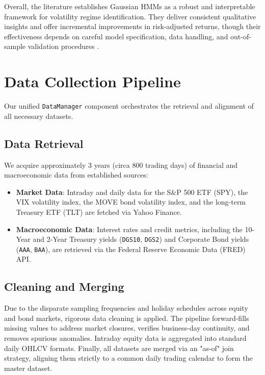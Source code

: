 \documentclass[a4paper,fleqn]{cas-dc} %
\begin{document}
Overall, the literature establishes Gaussian HMMs as a robust and interpretable framework for volatility regime identification. They deliver consistent qualitative insights and offer incremental improvements in risk-adjusted returns, though their effectiveness depends on careful model specification, data handling, and out-of-sample validation procedures \cite{Duriez2025, Wang2020}.

\section{Data Collection Pipeline}
Our unified \texttt{DataManager} component orchestrates the retrieval and alignment of all necessary datasets.

\subsection{Data Retrieval}
We acquire approximately 3 years (circa 800 trading days) of financial and macroeconomic data from established sources:
\begin{itemize}
    \item \textbf{Market Data}: Intraday and daily data for the S\&P 500 ETF (SPY), the VIX volatility index, the MOVE bond volatility index, and the long-term Treasury ETF (TLT) are fetched via Yahoo Finance.
    \item \textbf{Macroeconomic Data}: Interest rates and credit metrics, including the 10-Year and 2-Year Treasury yields (\texttt{DGS10}, \texttt{DGS2}) and Corporate Bond yields (\texttt{AAA}, \texttt{BAA}), are retrieved via the Federal Reserve Economic Data (FRED) API.
\end{itemize}

\subsection{Cleaning and Merging}
Due to the disparate sampling frequencies and holiday schedules across equity and bond markets, rigorous data cleaning is applied. The pipeline forward-fills missing values to address market closures, verifies business-day continuity, and removes spurious anomalies. Intraday equity data is aggregated into standard daily OHLCV formats. Finally, all datasets are merged via an "as-of" join strategy, aligning them strictly to a common daily trading calendar to form the master dataset.
\end{document}
